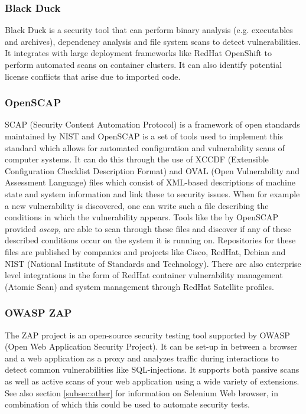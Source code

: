 \subsubsection{Black Duck}
Black Duck is a security tool that can perform binary analysis (e.g. executables and archives), dependency analysis and file system scans to detect vulnerabilities. It integrates with large deployment frameworks like RedHat OpenShift to perform automated scans on container clusters. It can also identify potential license conflicts that arise due to imported code.\cite{black-duck}

\subsubsection{OpenSCAP}
SCAP (Security Content Automation Protocol) is a framework of open standards maintained by NIST and OpenSCAP is a set of tools used to implement this standard which allows for automated configuration and vulnerability scans of computer systems.\cite{mitre-oval} It can do this through the use of XCCDF (Extensible Configuration Checklist Description Format) and OVAL (Open Vulnerability and Assessment Language) files which consist of XML-based descriptions of machine state and system information and link these to security issues.\cite{openscap,openscap-manual} When for example a new vulnerability is discovered, one can write such a file describing the conditions in which the vulnerability appears. Tools like the by OpenSCAP provided \textit{oscap,} are able to scan through these files and discover if any of these described conditions occur on the system it is running on. Repositories for these files are published by companies and projects like Cisco, RedHat, Debian and NIST (National Institute of Standards and Technology).\cite{oval-repo} There are also enterprise level integrations in the form of RedHat container vulnerability management (Atomic Scan) and system management through RedHat Satellite profiles.\cite{openscap-tools}

\pagebreak

\subsubsection{OWASP ZAP}
The ZAP project is an open-source security testing tool supported by OWASP (Open Web Application Security Project). It can be set-up in between a browser and a web application as a proxy and analyzes traffic during interactions to detect common vulnerabilities like SQL-injections. It supports both passive scans as well as active scans of your web application using a wide variety of extensions.\cite{owasp-zap,owasp-zap-ext} See also section \ref{subsec:other} for information on Selenium Web browser, in combination of which this could be used to automate security tests.

